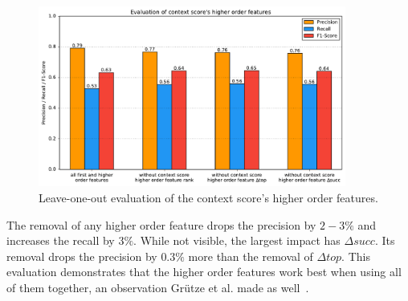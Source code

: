 \begin{figure}[H]
	\centering
	\includegraphics[width=0.9\textwidth]{img/higher_order_eval_context}
	\caption{Leave-one-out evaluation of the context score's higher order features.}
	\label{ho_eval_context}
\end{figure}
The removal of any higher order feature drops the precision by $2-3\%$ and increases the recall by $3\%$. While not visible, the largest impact has $\Delta succ$. Its removal drops the precision by $0.3\%$ more than the removal of $\Delta top$. This evaluation demonstrates that the higher order features work best when using all of them together, an observation Grütze et al. made as well\ \cite{coheel}.

